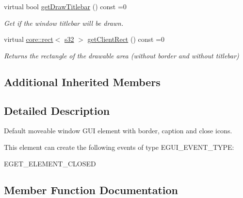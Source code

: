 \begin{DoxyCompactItemize}
\mbox{\label{classirr_1_1gui_1_1IGUIWindow_a634a224a31577fb7eeef578c9a351b69}} 
virtual bool \hyperlink{classirr_1_1gui_1_1IGUIWindow_a634a224a31577fb7eeef578c9a351b69}{get\+Draw\+Titlebar} () const =0
\begin{DoxyCompactList}\small\item\em Get if the window titlebar will be drawn. \end{DoxyCompactList}\item 
virtual \hyperlink{classirr_1_1core_1_1rect}{core\+::rect}$<$ \hyperlink{namespaceirr_ac66849b7a6ed16e30ebede579f9b47c6}{s32} $>$ \hyperlink{classirr_1_1gui_1_1IGUIWindow_aa6d240eb9d5b9b44c0e45fcef47e6216}{get\+Client\+Rect} () const =0
\begin{DoxyCompactList}\small\item\em Returns the rectangle of the drawable area (without border and without titlebar) \end{DoxyCompactList}\end{DoxyCompactItemize}
\subsection*{Additional Inherited Members}


\subsection{Detailed Description}
Default moveable window G\+UI element with border, caption and close icons. 

\begin{DoxyParagraph}{This element can create the following events of type E\+G\+U\+I\+\_\+\+E\+V\+E\+N\+T\+\_\+\+T\+Y\+PE\+:}
\begin{DoxyItemize}
\item E\+G\+E\+T\+\_\+\+E\+L\+E\+M\+E\+N\+T\+\_\+\+C\+L\+O\+S\+ED \end{DoxyItemize}

\end{DoxyParagraph}


\subsection{Member Function Documentation}
\mbox{\label{classirr_1_1gui_1_1IGUIWindow_aa6d240eb9d5b9b44c0e45fcef47e6216}} 
